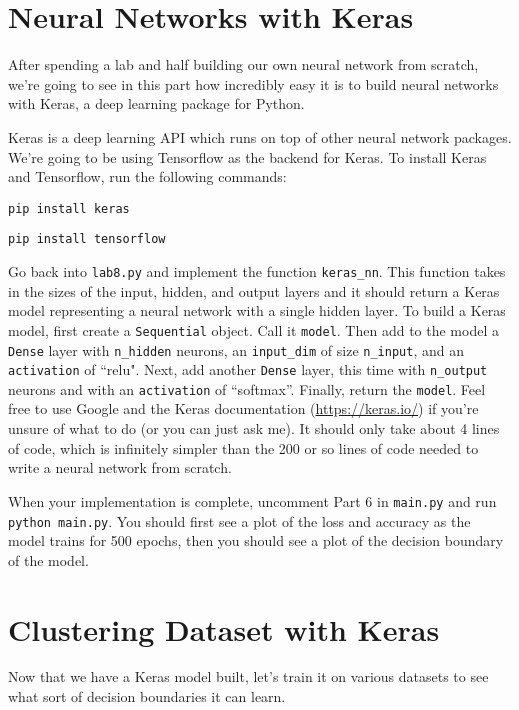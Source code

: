 \documentclass{article}
\begin{document}
\section{Neural Networks with Keras}

After spending a lab and half building our own neural network from scratch, we're going to see in this part how incredibly easy it is to build neural networks with Keras, a deep learning package for Python.

Keras is a deep learning API which runs on top of other neural network packages. We're going to be using Tensorflow as the backend for Keras. To install Keras and Tensorflow, run the following commands:

\vspace{2mm}

\texttt{pip install keras}

\texttt{pip install tensorflow}

\vspace{2mm}

Go back into \texttt{lab8.py} and implement the function \texttt{keras\_nn}. This function takes in the sizes of the input, hidden, and output layers and it should return a Keras model representing a neural network with a single hidden layer. To build a Keras model, first create a \texttt{Sequential} object. Call it \texttt{model}. Then add to the model a \texttt{Dense} layer with \texttt{n\_hidden} neurons, an \texttt{input\_dim} of size \texttt{n\_input}, and an \texttt{activation} of ``relu". Next, add another \texttt{Dense} layer, this time with \texttt{n\_output} neurons and with an \texttt{activation} of ``softmax''. Finally, return the \texttt{model}. Feel free to use Google and the Keras documentation (\url{https://keras.io/}) if you're unsure of what to do (or you can just ask me). It should only take about 4 lines of code, which is infinitely simpler than the 200 or so lines of code needed to write a neural network from scratch.

When your implementation is complete, uncomment Part 6 in \texttt{main.py} and run \texttt{python main.py}. You should first see a plot of the loss and accuracy as the model trains for 500 epochs, then you should see a plot of the decision boundary of the model.

\section{Clustering Dataset with Keras}

Now that we have a Keras model built, let's train it on various datasets to see what sort of decision boundaries it can learn.
\end{document}
